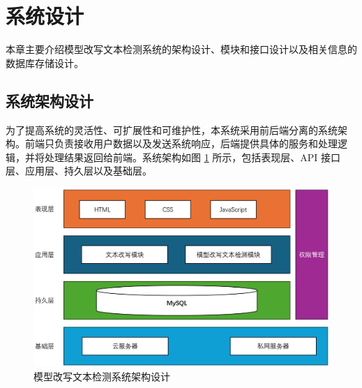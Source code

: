 \section{系统设计}
\label{sec:sys-design}

本章主要介绍模型改写文本检测系统的架构设计、模块和接口设计以及相关信息的数据库存储设计。

\subsection{系统架构设计}
\label{sec:sys-arch}

为了提高系统的灵活性、可扩展性和可维护性，本系统采用前后端分离的系统架构。前端只负责接收用户数据以及发送系统响应，后端提供具体的服务和处理逻辑，并将处理结果返回给前端。系统架构如图 \ref{fig:sys-arch} 所示，包括表现层、API 接口层、应用层、持久层以及基础层。

\begin{figure}[htb]
    \centering
    \includegraphics[width=\textwidth]{figures/sys-architecture.jpg}
    \caption{模型改写文本检测系统架构设计}
    \label{fig:sys-arch}
\end{figure}

